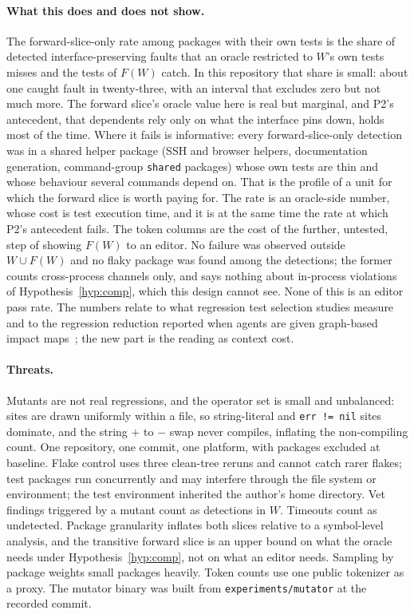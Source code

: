 \documentclass[10pt]{article}
\theoremstyle{definition}
\theoremstyle{plain}
\theoremstyle{remark}
\begin{document}
\paragraph{What this does and does not show.} The forward-slice-only rate among packages with their own tests is the share of detected interface-preserving faults that an oracle restricted to $W$'s own tests misses and the tests of $F(W)$ catch. In this repository that share is small: about one caught fault in twenty-three, with an interval that excludes zero but not much more. The forward slice's oracle value here is real but marginal, and P2's antecedent, that dependents rely only on what the interface pins down, holds most of the time. Where it fails is informative: every forward-slice-only detection was in a shared helper package (SSH and browser helpers, documentation generation, command-group \texttt{shared} packages) whose own tests are thin and whose behaviour several commands depend on. That is the profile of a unit for which the forward slice is worth paying for. The rate is an oracle-side number, whose cost is test execution time, and it is at the same time the rate at which P2's antecedent fails. The token columns are the cost of the further, untested, step of showing $F(W)$ to an editor. No failure was observed outside $W \cup F(W)$ and no flaky package was found among the \cliNDet{} detections; the former counts cross-process channels only, and says nothing about in-process violations of Hypothesis~\ref{hyp:comp}, which this design cannot see. None of this is an editor pass rate. The numbers relate to what regression test selection studies measure~\cite{legunsen2016extensive,gligoric2015practical} and to the regression reduction reported when agents are given graph-based impact maps~\cite{alonso2026tdad}; the new part is the reading as context cost.

\paragraph{Threats.} Mutants are not real regressions, and the operator set is small and unbalanced: sites are drawn uniformly within a file, so string-literal and \texttt{err != nil} sites dominate, and the string $+$ to $-$ swap never compiles, inflating the non-compiling count. One repository, one commit, one platform, with \cliNBaseFail{} packages excluded at baseline. Flake control uses three clean-tree reruns and cannot catch rarer flakes; test packages run concurrently and may interfere through the file system or environment; the test environment inherited the author's home directory. Vet findings triggered by a mutant count as detections in $W$. Timeouts count as undetected. Package granularity inflates both slices relative to a symbol-level analysis, and the transitive forward slice is an upper bound on what the oracle needs under Hypothesis~\ref{hyp:comp}, not on what an editor needs. Sampling by package weights small packages heavily. Token counts use one public tokenizer as a proxy. The mutator binary was built from \texttt{experiments/mutator} at the recorded commit.
\end{document}
